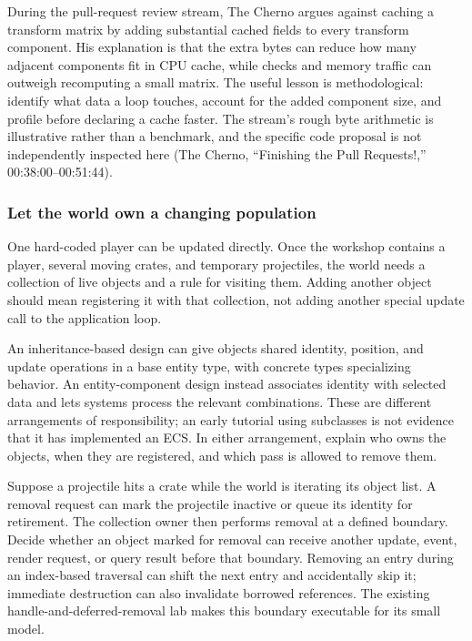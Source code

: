 \hypertarget{06-engine-ii-ch031-ecs-performance-claims-need-a-memory-layout-argument}{}

During the pull-request review stream, The Cherno argues against caching a transform matrix by adding substantial cached fields to every transform component. His explanation is that the extra bytes can reduce how many adjacent components fit in CPU cache, while checks and memory traffic can outweigh recomputing a small matrix. The useful lesson is methodological: identify what data a loop touches, account for the added component size, and profile before declaring a cache faster. The stream's rough byte arithmetic is illustrative rather than a benchmark, and the specific code proposal is not independently inspected here (The Cherno, ``Finishing the Pull Requests!,'' 00:38:00--00:51:44).

\subsubsection{Let the world own a changing population}\label{06-engine-ii-ch031-let-the-world-own-a-changing-population}

\hypertarget{06-engine-ii-ch031-let-the-world-own-a-changing-population}{}

One hard-coded player can be updated directly. Once the workshop contains a player, several moving crates, and temporary projectiles, the world needs a collection of live objects and a rule for visiting them. Adding another object should mean registering it with that collection, not adding another special update call to the application loop.

An inheritance-based design can give objects shared identity, position, and update operations in a base entity type, with concrete types specializing behavior. An entity-component design instead associates identity with selected data and lets systems process the relevant combinations. These are different arrangements of responsibility; an early tutorial using subclasses is not evidence that it has implemented an ECS. In either arrangement, explain who owns the objects, when they are registered, and which pass is allowed to remove them.

Suppose a projectile hits a crate while the world is iterating its object list. A removal request can mark the projectile inactive or queue its identity for retirement. The collection owner then performs removal at a defined boundary. Decide whether an object marked for removal can receive another update, event, render request, or query result before that boundary. Removing an entry during an index-based traversal can shift the next entry and accidentally skip it; immediate destruction can also invalidate borrowed references. The existing handle-and-deferred-removal lab makes this boundary executable for its small model.


